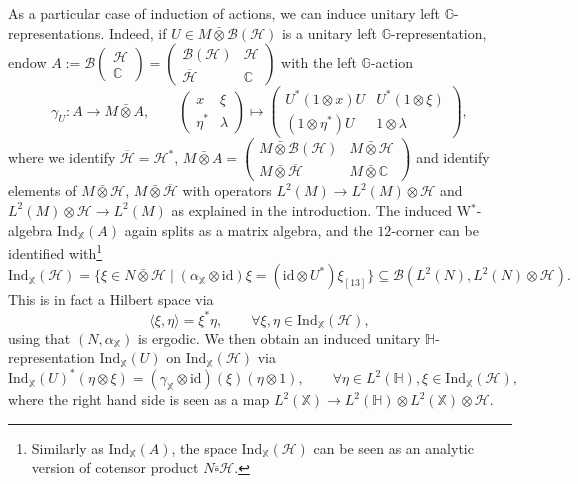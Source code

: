 \documentclass[reqno]{amsart}
\numberwithin{equation}{section}
\newcommand{\C}{\mathbb{C}}
\newcommand{\mcB}{\mathcal{B}}
\newcommand{\id}{\mathrm{id}}
\newcommand{\Hsp}{\mathcal{H}}
\newcommand{\G}{\mathbb{G}}
\newcommand{\Hh}{\mathbb{H}}
\newcommand{\X}{\mathbb{X}}
\newcommand{\Ind}{\mathrm{Ind}}
\newcommand{\ov}{\overline}
\newcommand{\mc}{\mathcal}
\begin{document}
As a particular case of induction of actions, we can induce unitary left $\G$-representations. Indeed, if $U\in M\bar{\otimes} \mcB(\Hsp)$ is a unitary left $\G$-representation, endow $A := \mcB\begin{pmatrix} \Hsp \\\C\end{pmatrix}= \begin{pmatrix} \mcB(\Hsp) & \Hsp \\ \overline{\Hsp} & \C\end{pmatrix}$ with the left $\G$-action
\[
\gamma_U\colon  A \rightarrow M\bar{\otimes} A,\qquad  \begin{pmatrix} x & \xi \\ \eta^* & \lambda\end{pmatrix} \mapsto \begin{pmatrix} U^*(1\otimes x)U & U^*(1\otimes \xi) \\ (1\otimes \eta^*)U & 1\otimes \lambda\end{pmatrix},
\]
where we identify $\ov{\mc{H}}=\mc{H}^*$, $M\bar\otimes A=\begin{pmatrix} M\bar\otimes\mcB(\Hsp) & M\bar\otimes\Hsp \\ M\bar\otimes\overline{\Hsp} & M\bar\otimes\C\end{pmatrix}$ and identify elements of $M\bar\otimes \mc{H}$, $M\bar\otimes \ov{\mc{H}}$ with operators $L^2(M)\rightarrow L^2(M)\otimes \mc{H}$ and $L^2(M)\otimes \mc{H}\rightarrow L^2(M)$ as explained in the introduction. The induced W$^*$-algebra $\Ind_{\X}(A)$ again splits as a matrix algebra, and the $12$-corner can be identified with\footnote{Similarly as $\Ind_{\X}(A)$, the space $\Ind_{\X}(\Hsp)$ can be seen as an analytic version of cotensor product $N\overline{\square}\mc{H}$.} 
\[
\Ind_{\X}(\Hsp) = \{\xi\in N \bar{\otimes} \Hsp \mid (\alpha_{\X} \otimes \id)\xi = (\id\otimes U^*)\xi_{[13]}\} \subseteq \mcB(L^2(N),L^2(N)\otimes \Hsp). 
\]
This is in fact a Hilbert space via
\[
\langle \xi ,\eta\rangle = \xi^*\eta,\qquad \forall\xi,\eta \in \Ind_{\X}(\mc{H}), 
\]
using that $(N,\alpha_{\X})$ is ergodic. We then obtain an induced unitary $\Hh$-representation $\Ind_{\X}(U)$ on $\Ind_{\X}(\Hsp)$ via 
\[
\Ind_{\X}(U)^*(\eta\otimes \xi) = (\gamma_{\X}\otimes \id)(\xi)(\eta\otimes 1),\qquad \forall \eta\in L^2(\Hh),\xi\in \Ind_{\X}(\Hsp),
\]
where the right hand side is seen as a map $L^2(\X)\rightarrow L^2(\Hh)\otimes L^2(\X)\otimes \mc{H}$.
\end{document}
